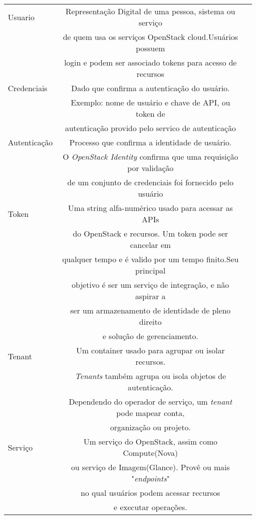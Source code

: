 	\begin{tabular}{|l||c|c|}
	\hline	
	Usuario&	 Representação Digital de uma pessoa, sistema ou serviço\\& de quem usa os serviços OpenStack cloud.Usuários possuem\\& login e podem ser associado tokens para acesso de recursos \\
	
	\hline \hline
	
	Credenciais& Dado que confirma a autenticação do usuário.\\& Exemplo: nome de usuário e chave de API, ou token de\\& autenticação provido pelo servico de autenticação \\
	
	\hline \hline
	
	Autenticação& Processo que confirma a identidade de usuário.\\& O \emph{OpenStack Identity} confirma que uma requisição por validação\\& de um conjunto de credenciais foi fornecido pelo usuário \\
	
	\hline \hline
	
	Token& Uma string alfa-numérico usado para acessar as APIs\\& do OpenStack e recursos. Um token pode ser cancelar em\\& qualquer tempo e é valido por um tempo finito.Seu principal\\& objetivo é ser um serviço de integração, e não aspirar a\\& ser um armazenamento de identidade de pleno direito\\& e solução de gerenciamento. \\
	
	\hline \hline
	
	Tenant& Um container usado para agrupar ou isolar recursos.\\& \emph{Tenants} também agrupa ou isola objetos de autenticação.\\& Dependendo do operador de serviço, um \emph{tenant} pode mapear conta,\\& organização ou projeto. \\
	
	\hline \hline
	
	Serviço&  Um serviço do OpenStack, assim como Compute(Nova)\\& ou serviço de Imagem(Glance). Provê ou mais "\emph{endpoints}"\\& no qual usuários podem acessar recursos\\& e  executar operações. \\
	

\end{tabular}
